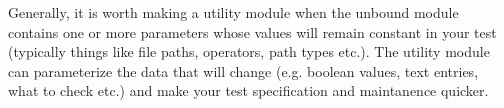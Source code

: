 Generally, it is worth making a utility module when the unbound module contains one or more parameters whose values will remain constant in your test (typically things like file paths, operators, path types etc.). The utility module can parameterize the data that will change (e.g. boolean values, text entries, what to check etc.) and make your test specification and maintanence quicker. 



